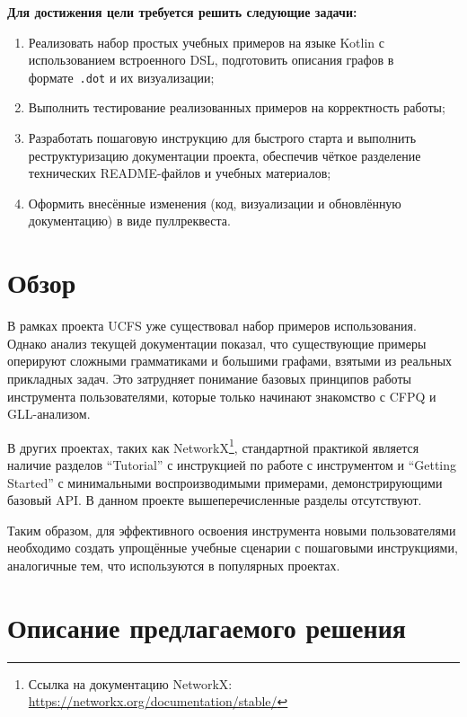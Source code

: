 \documentclass[a4paper]{article}
\begin{document}
\textbf{Для достижения цели требуется решить следующие задачи:}
\begin{enumerate}
    \item Реализовать набор простых учебных примеров на языке Kotlin с использованием встроенного DSL, подготовить описания графов в формате~\texttt{.dot} и их визуализации;
    \item Выполнить тестирование реализованных примеров на корректность работы;
    \item Разработать пошаговую инструкцию для быстрого старта и выполнить реструктуризацию документации проекта, обеспечив чёткое разделение технических README-файлов и учебных материалов;
    \item Оформить внесённые изменения (код, визуализации и обновлённую документацию) в виде пуллреквеста.
\end{enumerate}

\section{Обзор}

В рамках проекта UCFS уже существовал набор примеров использования. Однако анализ текущей документации показал, что существующие примеры оперируют сложными грамматиками и большими графами, взятыми из реальных прикладных задач. Это затрудняет понимание базовых принципов работы инструмента пользователями, которые только начинают знакомство с CFPQ и GLL-анализом.

В других проектах, таких как NetworkX\footnote{Ссылка на документацию NetworkX: \url{https://networkx.org/documentation/stable/}}, стандартной практикой является наличие разделов \enquote{Tutorial} с инструкцией по работе с инструментом и \enquote{Getting Started} с минимальными воспроизводимыми примерами, демонстрирующими базовый API. В данном проекте вышеперечисленные разделы отсутствуют.

Таким образом, для эффективного освоения инструмента новыми пользователями необходимо создать упрощённые учебные сценарии с пошаговыми инструкциями, аналогичные тем, что используются в популярных проектах.

\section{Описание предлагаемого решения}
\end{document}
